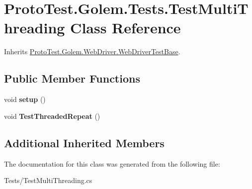 \hypertarget{class_proto_test_1_1_golem_1_1_tests_1_1_test_multi_threading}{\section{Proto\-Test.\-Golem.\-Tests.\-Test\-Multi\-Threading Class Reference}
\label{class_proto_test_1_1_golem_1_1_tests_1_1_test_multi_threading}
}


Inherits \hyperlink{class_proto_test_1_1_golem_1_1_web_driver_1_1_web_driver_test_base}{Proto\-Test.\-Golem.\-Web\-Driver.\-Web\-Driver\-Test\-Base}.

\subsection*{Public Member Functions}
\begin{DoxyCompactItemize}
\item 
\hypertarget{class_proto_test_1_1_golem_1_1_tests_1_1_test_multi_threading_a7008cdbce7516a9aafb569ec614394ce}{void {\bfseries setup} ()}\label{class_proto_test_1_1_golem_1_1_tests_1_1_test_multi_threading_a7008cdbce7516a9aafb569ec614394ce}

\item 
\hypertarget{class_proto_test_1_1_golem_1_1_tests_1_1_test_multi_threading_a38ad0424bab842c95670fddc2d657703}{void {\bfseries Test\-Threaded\-Repeat} ()}\label{class_proto_test_1_1_golem_1_1_tests_1_1_test_multi_threading_a38ad0424bab842c95670fddc2d657703}

\end{DoxyCompactItemize}
\subsection*{Additional Inherited Members}


The documentation for this class was generated from the following file\-:\begin{DoxyCompactItemize}
\item 
Tests/Test\-Multi\-Threading.\-cs\end{DoxyCompactItemize}
